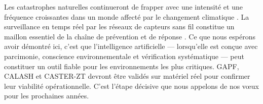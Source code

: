 Les catastrophes naturelles continueront de frapper avec une intensité et une fréquence croissantes dans un monde affecté par le changement climatique \cite{IPCC2021AR6}. La surveillance en temps réel par les réseaux de capteurs sans fil constitue un maillon essentiel de la chaîne de prévention et de réponse \cite{UNDRR2015Sendai}. Ce que nous espérons avoir démontré ici, c'est que l'intelligence artificielle --- lorsqu'elle est conçue avec parcimonie, conscience environnementale et vérification systématique --- peut constituer un outil fiable pour les environnements les plus critiques. GAPF, CALASH et CASTER-ZT devront être validés sur matériel réel pour confirmer leur viabilité opérationnelle. C'est l'étape décisive que nous appelons de nos vœux pour les prochaines années.
